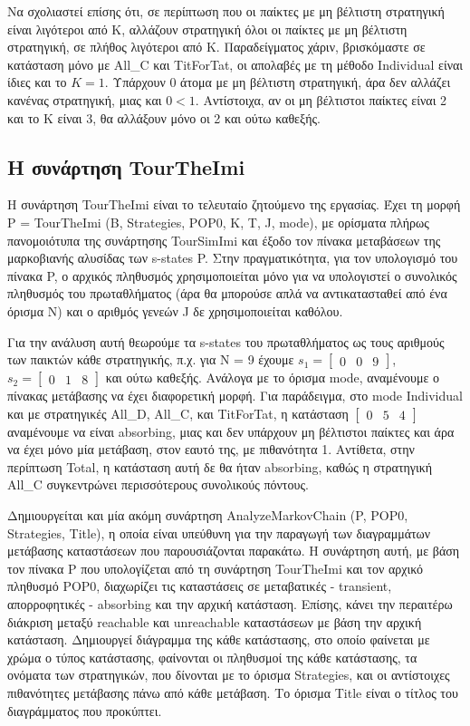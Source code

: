 \documentclass[12pt]{article}
\begin{document}
Να σχολιαστεί επίσης ότι, σε περίπτωση που οι παίκτες με μη βέλτιστη στρατηγική είναι λιγότεροι από K, αλλάζουν στρατηγική όλοι οι παίκτες με μη βέλτιστη στρατηγική, σε πλήθος λιγότεροι από K. Παραδείγματος χάριν, βρισκόμαστε σε κατάσταση μόνο με All\_C και TitForTat, οι απολαβές με τη μέθοδο Individual είναι ίδιες και το $K = 1$. Υπάρχουν 0 άτομα με μη βέλτιστη στρατηγική, άρα δεν αλλάζει κανένας στρατηγική, μιας και $0<1$. Αντίστοιχα, αν οι μη βέλτιστοι παίκτες είναι 2 και το K είναι 3, θα αλλάξουν μόνο οι 2 και ούτω καθεξής.

\subsection{Η συνάρτηση TourTheImi}
Η συνάρτηση TourTheImi είναι το τελευταίο ζητούμενο της εργασίας. Έχει τη μορφή P\- =\- TourTheImi\- (B,\- Strategies,\- POP0,\- K,\- T,\- J,\- mode), με ορίσματα πλήρως πανομοιότυπα της συνάρτησης TourSimImi και έξοδο τον πίνακα μεταβάσεων της μαρκοβιανής αλυσίδας των s-states P. Στην πραγματικότητα, για τον υπολογισμό του πίνακα P, ο αρχικός πληθυσμός χρησιμοποιείται μόνο για να υπολογιστεί ο συνολικός πληθυσμός του πρωταθλήματος (άρα θα μπορούσε απλά να αντικατασταθεί από ένα όρισμα N) και ο αριθμός γενεών J δε χρησιμοποιείται καθόλου.

Για την ανάλυση αυτή θεωρούμε τα s-states του πρωταθλήματος ως τους αριθμούς των παικτών κάθε στρατηγικής, π.χ. για N = 9 έχουμε $s_1 = \begin{bmatrix} 0 & 0 & 9 \end{bmatrix}$, $s_2 = \begin{bmatrix} 0 & 1 & 8 \end{bmatrix}$ και ούτω καθεξής. Ανάλογα με το όρισμα mode, αναμένουμε ο πίνακας μετάβασης να έχει διαφορετική μορφή. Για παράδειγμα, στο mode Individual και με στρατηγικές All\_D, All\_C, και TitForTat, η κατάσταση $\begin{bmatrix} 0 & 5 & 4 \end{bmatrix}$ αναμένουμε να είναι absorbing, μιας και δεν υπάρχουν μη βέλτιστοι παίκτες και άρα να έχει μόνο μία μετάβαση, στον εαυτό της, με πιθανότητα 1. Αντίθετα, στην περίπτωση Total, η κατάσταση αυτή δε θα ήταν absorbing, καθώς η στρατηγική All\_C συγκεντρώνει περισσότερους συνολικούς πόντους.

Δημιουργείται και μία ακόμη συνάρτηση AnalyzeMarkovChain\- (P,\- POP0,\- Str\-at\-e\-gies,\- Title), η οποία είναι υπεύθυνη για την παραγωγή των διαγραμμάτων μετάβασης καταστάσεων που παρουσιάζονται παρακάτω. Η συνάρτηση αυτή, με βάση τον πίνακα P που υπολογίζεται από τη συνάρτηση TourTheImi και τον αρχικό πληθυσμό POP0, διαχωρίζει τις καταστάσεις σε μεταβατικές - transient, απορροφητικές - absorbing και την αρχική κατάσταση. Επίσης, κάνει την περαιτέρω διάκριση μεταξύ reachable και unreachable καταστάσεων με βάση την αρχική κατάσταση. Δημιουργεί διάγραμμα της κάθε κατάστασης, στο οποίο φαίνεται με χρώμα ο τύπος κατάστασης, φαίνονται οι πληθυσμοί της κάθε κατάστασης, τα ονόματα των στρατηγικών, που δίνονται με το όρισμα Strategies, και οι αντίστοιχες πιθανότητες μετάβασης πάνω από κάθε μετάβαση. Το όρισμα Title είναι ο τίτλος του διαγράμματος που προκύπτει. 
\end{document}
